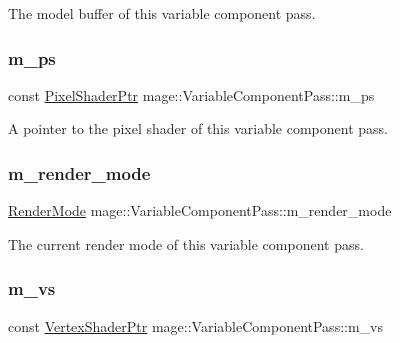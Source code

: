 The model buffer of this variable component pass. \hypertarget{classmage_1_1_variable_component_pass_a67b17bd7ac7f34526b37c55e34b02440}{}\label{classmage_1_1_variable_component_pass_a67b17bd7ac7f34526b37c55e34b02440} 
\subsubsection{\texorpdfstring{m\+\_\+ps}{m\_ps}}
{\footnotesize\ttfamily const \hyperlink{namespacemage_acbec875bb5e5e085e32ed244a24d2b6f}{Pixel\+Shader\+Ptr} mage\+::\+Variable\+Component\+Pass\+::m\+\_\+ps\hspace{0.3cm}{\ttfamily [private]}}

A pointer to the pixel shader of this variable component pass. \hypertarget{classmage_1_1_variable_component_pass_a6e9a67c5251951f887d64c1a6d50a33c}{}\label{classmage_1_1_variable_component_pass_a6e9a67c5251951f887d64c1a6d50a33c} 
\subsubsection{\texorpdfstring{m\+\_\+render\+\_\+mode}{m\_render\_mode}}
{\footnotesize\ttfamily \hyperlink{namespacemage_a9d24b35ed0bdecf8535e2b91fe0eebba}{Render\+Mode} mage\+::\+Variable\+Component\+Pass\+::m\+\_\+render\+\_\+mode\hspace{0.3cm}{\ttfamily [private]}}

The current render mode of this variable component pass. \hypertarget{classmage_1_1_variable_component_pass_a41ed4307386980b1b18761e603718c0e}{}\label{classmage_1_1_variable_component_pass_a41ed4307386980b1b18761e603718c0e} 
\subsubsection{\texorpdfstring{m\+\_\+vs}{m\_vs}}
{\footnotesize\ttfamily const \hyperlink{namespacemage_a1f19b094f771e30bc0a6c1cebcc0dd58}{Vertex\+Shader\+Ptr} mage\+::\+Variable\+Component\+Pass\+::m\+\_\+vs\hspace{0.3cm}{\ttfamily [private]}}

